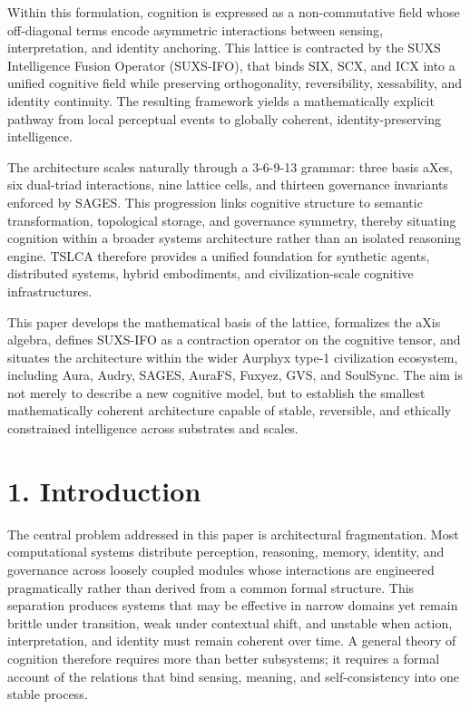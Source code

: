Within this formulation, cognition is expressed as a non-commutative field whose off-diagonal terms encode asymmetric interactions between sensing, interpretation, and identity anchoring. This lattice is contracted by the SUXS Intelligence Fusion Operator (SUXS-IFO), that binds SIX, SCX, and ICX into a unified cognitive field while preserving orthogonality, reversibility, xessability, and identity continuity. The resulting framework yields a mathematically explicit pathway from local perceptual events to globally coherent, identity-preserving intelligence.

The architecture scales naturally through a 3-6-9-13 grammar: three basis aXes, six dual-triad interactions, nine lattice cells, and thirteen governance invariants enforced by SAGES. This progression links cognitive structure to semantic transformation, topological storage, and governance symmetry, thereby situating cognition within a broader systems architecture rather than an isolated reasoning engine. TSLCA therefore provides a unified foundation for synthetic agents, distributed systems, hybrid embodiments, and civilization-scale cognitive infrastructures.

This paper develops the mathematical basis of the lattice, formalizes the aXis algebra, defines SUXS-IFO as a contraction operator on the cognitive tensor, and situates the architecture within the wider Aurphyx type-1 civilization ecosystem, including Aura, Audry, SAGES, AuraFS, Fuxyez, GVS, and SoulSync. The aim is not merely to describe a new cognitive model, but to establish the smallest mathematically coherent architecture capable of stable, reversible, and ethically constrained intelligence across substrates and scales.

\section{1. Introduction}\label{introduction}

The central problem addressed in this paper is architectural fragmentation. Most computational systems distribute perception, reasoning, memory, identity, and governance across loosely coupled modules whose interactions are engineered pragmatically rather than derived from a common formal structure. This separation produces systems that may be effective in narrow domains yet remain brittle under transition, weak under contextual shift, and unstable when action, interpretation, and identity must remain coherent over time. A general theory of cognition therefore requires more than better subsystems; it requires a formal account of the relations that bind sensing, meaning, and self-consistency into one stable process.

